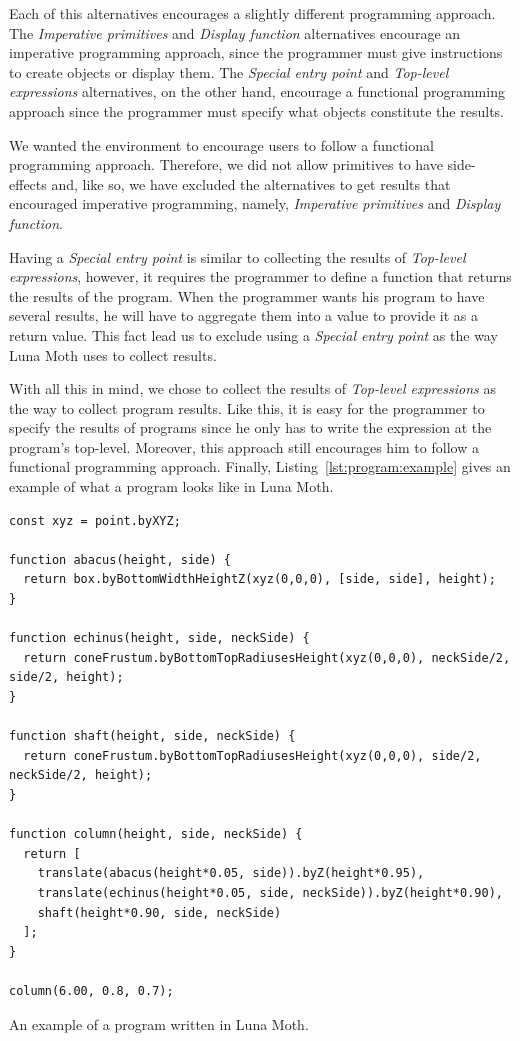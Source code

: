 Each of this alternatives encourages a slightly different programming approach.
The {\it Imperative primitives} and {\it Display function} alternatives encourage an imperative programming approach, since the programmer must give instructions to create objects or display them.
The {\it Special entry point} and {\it Top-level expressions} alternatives, on the other hand, encourage a functional programming approach since the programmer must specify what objects constitute the results.

We wanted the environment to encourage users to follow a functional programming approach.
Therefore, we did not allow primitives to have side-effects and, like so, we have excluded the alternatives to get results that encouraged imperative programming, namely, {\it Imperative primitives} and {\it Display function}.

Having a {\it Special entry point} is similar to collecting the results of {\it Top-level expressions}, however, it requires the programmer to define a function that returns the results of the program.
When the programmer wants his program to have several results, he will have to aggregate them into a value to provide it as a return value.
This fact lead us to exclude using a {\it Special entry point} as the way Luna Moth uses to collect results.

With all this in mind, we chose to collect the results of {\it Top-level expressions} as the way to collect program results.
Like this, it is easy for the programmer to specify the results of programs since he only has to write the expression at the program's top-level.
Moreover, this approach still encourages him to follow a functional programming approach.
Finally, Listing~\ref{lst:program:example} gives an example of what a program looks like in Luna Moth.

\begin{listing}
\begin{verbatim}
const xyz = point.byXYZ;

function abacus(height, side) {
  return box.byBottomWidthHeightZ(xyz(0,0,0), [side, side], height);
}

function echinus(height, side, neckSide) {
  return coneFrustum.byBottomTopRadiusesHeight(xyz(0,0,0), neckSide/2, side/2, height);
}

function shaft(height, side, neckSide) {
  return coneFrustum.byBottomTopRadiusesHeight(xyz(0,0,0), side/2, neckSide/2, height);
}

function column(height, side, neckSide) {
  return [
    translate(abacus(height*0.05, side)).byZ(height*0.95),
    translate(echinus(height*0.05, side, neckSide)).byZ(height*0.90),
    shaft(height*0.90, side, neckSide)
  ];
}

column(6.00, 0.8, 0.7);
\end{verbatim}
\caption{An example of a program written in Luna Moth.}
\label{lst:program:example}
\end{listing}


